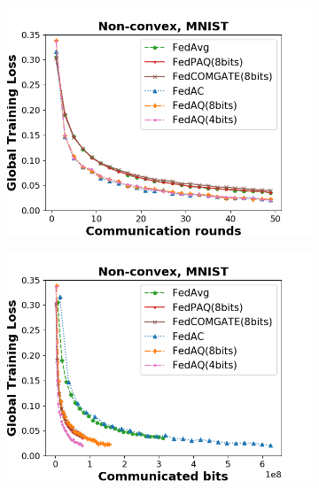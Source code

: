 \begin{figure}[!htbp]
    \setcounter{subfigure}{0}
    \begin{subfigure}[b]{0.31\textwidth}
    \includegraphics[width=\textwidth]{figure/loss_iid_comm_localstep_100_2.png}
    \end{subfigure}
    \begin{subfigure}[b]{0.31\textwidth}
    \includegraphics[width=\textwidth]{figure/loss_iid_bits_localstep_100_2.png}
    \end{subfigure}
    \begin{subfigure}[b]{0.31\textwidth}

\end{subfigure}
\end{figure}
